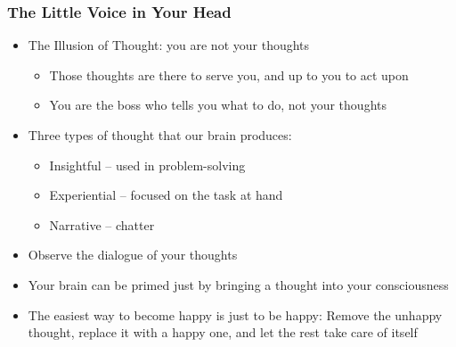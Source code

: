 \begin{frame}[fragile]\frametitle{The Little Voice in Your Head}

\begin{itemize}
\item The Illusion of Thought: you are not your thoughts
	\begin{itemize}
	\item Those thoughts are there to serve you, and up to you to act upon
	\item You are the boss who tells you what to do, not your thoughts 
	\end{itemize}
\item Three types of thought that our brain produces:
	\begin{itemize}
	\item Insightful – used in problem-solving
	\item Experiential – focused on the task at hand
	\item Narrative – chatter 
	\end{itemize}
\item Observe the dialogue of your thoughts
\item Your brain can be primed just by bringing a thought into your consciousness
\item The easiest way to become happy is just to be happy: Remove the unhappy thought, replace it with a happy one, and let the rest take care of itself 
\end{itemize}
\end{frame}

